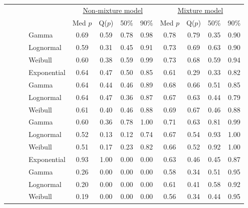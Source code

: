 \documentclass[useAMS,usenatbib,referee,12pt]{article}
\begin{document}
\begin{table}[ht]
\vspace{1.2cm}

\begin{tabular}{l|l|l|l|cccc|cccc}
 \multicolumn{4}{c|}{ } & \multicolumn{4}{c|}{\underline{Non-mixture model}} & \multicolumn{4}{c}{\underline{Mixture model}} \\
 \multicolumn{4}{c|}{ } & Med $p$ & Q($p$) & 50\% & 90\% & Med $p$ & Q($p$) & 50\% & 90\% \\ 
  \hline
  \hline
 \parbox[t]{2mm}{} & \parbox[t]{2mm}{} & \parbox[t]{2mm}{}& Gamma & 0.69 & 0.59 & 0.78 & 0.98 & 0.78 & 0.79 & 0.35 & 0.90 \\ 
   &  &  & Lognormal & 0.59 & 0.31 & 0.45 & 0.91 & 0.73 & 0.69 & 0.63 & 0.90 \\ 
   &  &  & Weibull & 0.60 & 0.38 & 0.59 & 0.99 & 0.73 & 0.68 & 0.59 & 0.94 \\
   &  &  & Exponential & 0.64 & 0.47 & 0.50 & 0.85 & 0.61 & 0.29 & 0.33 & 0.82 \\ 
 & & \parbox[t]{2mm}{}& Gamma & 0.64 & 0.44 & 0.46 & 0.89 & 0.68 & 0.66 & 0.51 & 0.85 \\ 
   &  &  & Lognormal & 0.64 & 0.47 & 0.36 & 0.87 & 0.67 & 0.63 & 0.44 & 0.79 \\ 
   &  &  & Weibull & 0.61 & 0.40 & 0.46 & 0.88 & 0.69 & 0.67 & 0.46 & 0.88 \\ 
& \parbox[t]{2mm}{} & \parbox[t]{2mm}{}& Gamma & 0.60 & 0.36 & 0.78 & 1.00 & 0.71 & 0.63 & 0.81 & 0.99 \\ 
   &  &  & Lognormal & 0.52 & 0.13 & 0.12 & 0.74 & 0.67 & 0.54 & 0.93 & 1.00 \\ 
   &  &  & Weibull & 0.51 & 0.17 & 0.23 & 0.82 & 0.66 & 0.52 & 0.92 & 1.00 \\ 
   &  &  & Exponential & 0.93 & 1.00 & 0.00 & 0.00 & 0.63 & 0.46 & 0.45 & 0.87 \\ 
 & & \parbox[t]{2mm}{} & Gamma & 0.26 & 0.00 & 0.00 & 0.00 & 0.58 & 0.34 & 0.51 & 0.95 \\ 
   &  &  & Lognormal & 0.20 & 0.00 & 0.00 & 0.00 & 0.61 & 0.41 & 0.58 & 0.92 \\ 
   &  &  & Weibull & 0.19 & 0.00 & 0.00 & 0.00 & 0.56 & 0.34 & 0.44 & 0.95 \\ 

\end{tabular}
\end{table}
\end{document}
